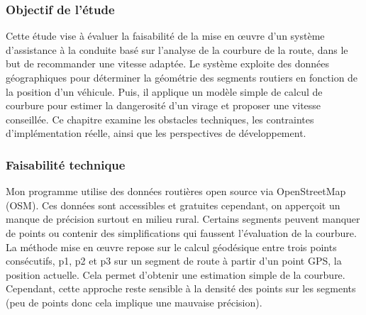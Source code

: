 

\subsubsection{Objectif de l'étude}
Cette étude vise à évaluer la faisabilité de la mise en œuvre d’un système d’assistance à la conduite basé sur l’analyse de la courbure de la route, dans le but de recommander une vitesse adaptée. Le système exploite des données géographiques pour déterminer la géométrie des segments routiers en fonction de la position d’un véhicule. Puis, il applique un modèle simple de calcul de courbure pour estimer la dangerosité d’un virage et proposer une vitesse conseillée. Ce chapitre examine les obstacles techniques, les contraintes d’implémentation réelle, ainsi que les perspectives de développement.


\subsubsection{Faisabilité technique}
Mon programme utilise des données routières open source via OpenStreetMap (OSM). Ces données sont accessibles et gratuites cependant, on apperçoit un manque de précision surtout en milieu rural. Certains segments peuvent manquer de points ou contenir des simplifications qui faussent l’évaluation de la courbure.
La méthode mise en œuvre repose sur le calcul géodésique entre trois points consécutifs, p1, p2 et p3 sur un segment de route à partir d'un point GPS, la position actuelle. Cela permet d’obtenir une estimation simple de la courbure.
Cependant, cette approche reste sensible à la densité des points sur les segments (peu de points donc cela implique une mauvaise précision).

